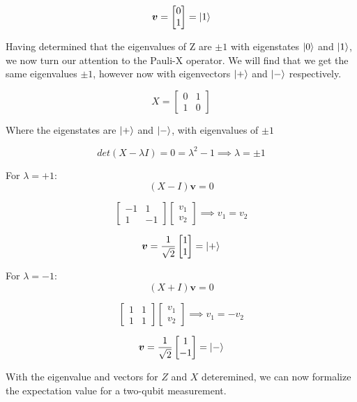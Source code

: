 \documentclass[12pt]{article}
\begin{document}
$$
\boldsymbol{v} = \begin{bmatrix}
0 \\
1
\end{bmatrix} = \ket{1}
$$

Having determined that the eigenvalues of Z are $\pm1$ with eigenstates $\ket{0}$ and $\ket{1}$, we now turn our attention to the Pauli-X operator. We will find that we get the same eigenvalues $\pm1$, however now with eigenvectors $\ket{+}$ and $\ket{-}$ respectively.

$$
X = \begin{bmatrix}
0 & 1 \\
1 & 0
\end{bmatrix}
$$

Where the eigenstates are $\ket{+}$ and $\ket{-}$, with eigenvalues of $\pm1$

$$
det(X-\lambda I) = 0 = \lambda^2 -1 \implies \lambda = \pm 1
$$

For $\lambda = +1$:
$$
(X-I)\boldsymbol{v} = 0 
$$

$$
\begin{bmatrix}
-1 & 1 \\
1 & -1
\end{bmatrix}
\begin{bmatrix}
v_1 \\
v_2
\end{bmatrix} \implies v_1 = v_2
$$

$$
\boldsymbol{v} = \frac{1}{\sqrt{2}}\begin{bmatrix}
1 \\
1
\end{bmatrix} = \ket{+}
$$

For $\lambda = -1$:
$$
(X+I)\boldsymbol{v} = 0 
$$

$$
\begin{bmatrix}
1 & 1 \\
1 & 1
\end{bmatrix}
\begin{bmatrix}
v_1 \\
v_2
\end{bmatrix} \implies v_1 = -v_2
$$

$$
\boldsymbol{v} = \frac{1}{\sqrt{2}}\begin{bmatrix}
1 \\
-1
\end{bmatrix} = \ket{-}
$$

With the eigenvalue and vectors for $Z$ and $X$ deteremined, we can now formalize the expectation value for a two-qubit measurement. 
\end{document}
